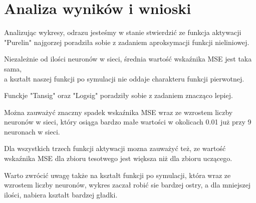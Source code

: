 \documentclass[12pt,titlepage]{article}
\begin{document}
    \section{Analiza wyników i wnioski}
    Analizując wykresy, odrazu jesteśmy w stanie stwierdzić ze funkcja aktywacji "Purelin" najgorzej poradziła sobie z zadaniem aproksymacji funkcji nieliniowej.\newline

    Niezależnie od ilości neuronów w sieci, średnia wartość wskaźnika MSE jest taka sama, \\a kształt naszej funkcji po symulacji nie oddaje charakteru funkcji pierwotnej.\newline

    Funckje "Tansig" oraz "Logsig" poradziły sobie z zadaniem znacząco lepiej.\newline

    Można zauważyć znaczny spadek wskaźnika MSE wraz ze wzrostem liczby neuronów w sieci, który osiąga bardzo małe wartości w okolicach 0.01 już przy 9 neuronach w sieci.\newline

    Dla wszystkich trzech funkcji aktywacji mozna zauważyć też, ze wartość wskaźnika MSE dla zbioru tesotwego jest większa niż dla zbioru uczącego. \newline

    Warto zwrócić uwagę także na kształt funkcji po symulacji, która wraz ze wzrostem liczby neuronów, wykres zaczał robić sie bardzej ostry, a dla mniejszej ilości, nabiera kształt bardzej gładki.\newline
\end{document}
